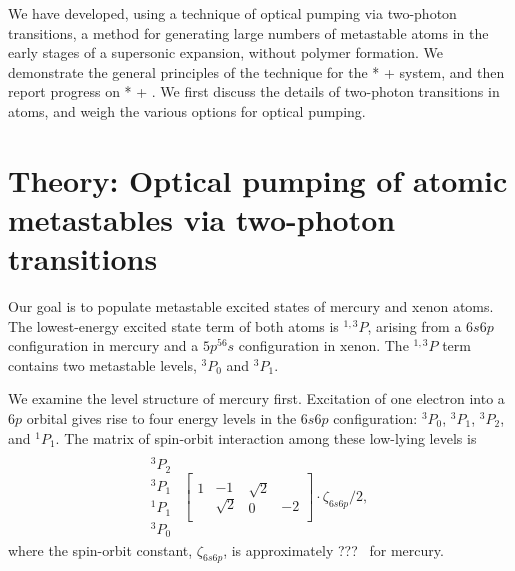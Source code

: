 \documentclass[12pt]{mitthesis}
\begin{document}
We have developed, using a technique of optical pumping via two-photon
transitions, a method for generating large numbers of metastable atoms
in the early stages of a supersonic expansion, without polymer
formation.  We demonstrate the general principles of the technique for
the * +  system, and then report progress on
* + .  We first discuss the details of two-photon
transitions in atoms, and weigh the various options for optical
pumping.

\section{Theory: Optical pumping of atomic metastables via two-photon
  transitions}

Our goal is to populate metastable excited states of mercury and xenon
atoms.  The lowest-energy excited state term of both atoms is
$^{1,3}P$, arising from a $6s6p$ configuration in mercury and a
$5p^56s$ configuration in xenon.  The $^{1,3}P$ term contains two
metastable levels, $^3P_0$ and $ ^3P_1$.

We examine the level structure of mercury first.  Excitation of one
electron into a $6p$ orbital gives rise to four energy levels in the
$6s6p$ configuration: $^3P_0$, $^3P_1$, $^3P_2$, and $^1P_1$.  The
matrix of spin-orbit interaction
among these low-lying levels is
\begin{equation}
  \begin{array}{c} \\ ^3P_2 \\ ^3P_1 \\ ^1P_1 \\ ^3P_0 \end{array}
  \begin{array}{cccc} \\
  \left [ 
    \begin{array}{c} 1     \\ \; \\ \;  \\ \;  \end{array} 
    \begin{array}{c} \;    \\ -1 \\ \sqrt{2} \\ \; \end{array}  
    \begin{array}{c} \;    \\ \sqrt{2} \\ 0  \\ \; \end{array}  
    \begin{array}{c}  \\  \\  \\ -2  \end{array}  
  \right ] \cdot \zeta_{6s6p}/2,
  \end{array}
\end{equation}
where the spin-orbit constant, $\zeta_{6s6p}$, is approximately ???
\rcm\ for mercury.
\end{document}
